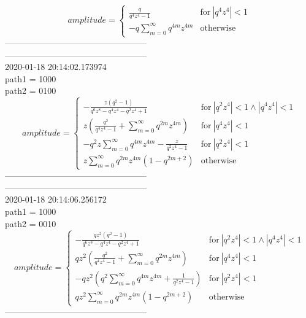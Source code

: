 \documentclass{jsreport}
\begin{document}
$$amplitude = \begin{cases} \frac{q}{q^{4} z^{4} - 1} & \text{for}\: \left|{q^{4} z^{4}}\right| < 1 \\- q \sum_{m=0}^{\infty} q^{4 m} z^{4 m} & \text{otherwise} \end{cases}$$
--------------------------------------------------\\
--------------------------------------------------\\
2020-01-18 20:14:02.173974\\
path1 = 1000\\
path2 = 0100\\
$$amplitude = \begin{cases} - \frac{z \left(q^{2} - 1\right)}{q^{6} z^{8} - q^{4} z^{4} - q^{2} z^{4} + 1} & \text{for}\: \left|{q^{2} z^{4}}\right| < 1 \wedge \left|{q^{4} z^{4}}\right| < 1 \\z \left(\frac{q^{2}}{q^{4} z^{4} - 1} + \sum_{m=0}^{\infty} q^{2 m} z^{4 m}\right) & \text{for}\: \left|{q^{4} z^{4}}\right| < 1 \\- q^{2} z \sum_{m=0}^{\infty} q^{4 m} z^{4 m} - \frac{z}{q^{2} z^{4} - 1} & \text{for}\: \left|{q^{2} z^{4}}\right| < 1 \\z \sum_{m=0}^{\infty} q^{2 m} z^{4 m} \left(1 - q^{2 m + 2}\right) & \text{otherwise} \end{cases}$$
--------------------------------------------------\\
--------------------------------------------------\\
2020-01-18 20:14:06.256172\\
path1 = 1000\\
path2 = 0010\\
$$amplitude = \begin{cases} - \frac{q z^{2} \left(q^{2} - 1\right)}{q^{6} z^{8} - q^{4} z^{4} - q^{2} z^{4} + 1} & \text{for}\: \left|{q^{2} z^{4}}\right| < 1 \wedge \left|{q^{4} z^{4}}\right| < 1 \\q z^{2} \left(\frac{q^{2}}{q^{4} z^{4} - 1} + \sum_{m=0}^{\infty} q^{2 m} z^{4 m}\right) & \text{for}\: \left|{q^{4} z^{4}}\right| < 1 \\- q z^{2} \left(q^{2} \sum_{m=0}^{\infty} q^{4 m} z^{4 m} + \frac{1}{q^{2} z^{4} - 1}\right) & \text{for}\: \left|{q^{2} z^{4}}\right| < 1 \\q z^{2} \sum_{m=0}^{\infty} q^{2 m} z^{4 m} \left(1 - q^{2 m + 2}\right) & \text{otherwise} \end{cases}$$
--------------------------------------------------\\
\end{document}
